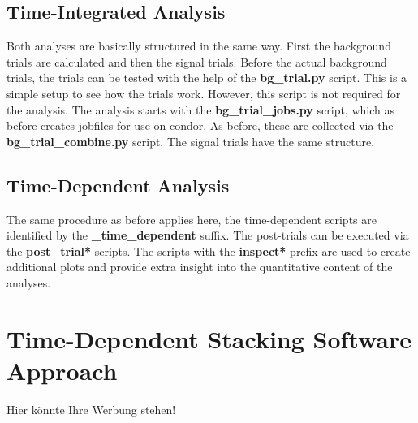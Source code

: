\subsection{Time-Integrated Analysis}

Both analyses are basically structured in the same way.
First the background trials are calculated and then the signal trials.
Before the actual background trials, the trials can be tested with the help of the \textbf{bg\_trial.py} script.
This is a simple setup to see how the trials work.
However, this script is not required for the analysis.
The analysis starts with the \textbf{bg\_trial\_jobs.py} script, which as before creates jobfiles for use on condor.
As before, these are collected via the \textbf{bg\_trial\_combine.py} script.
The signal trials have the same structure.

\subsection{Time-Dependent Analysis}

The same procedure as before applies here, the time-dependent scripts are identified by the \textbf{\_time\_dependent} suffix.
The post-trials can be executed via the \textbf{post\_trial*} scripts.
The scripts with the \textbf{inspect*} prefix are used to create additional plots and provide extra insight into the quantitative content of the analyses.

\section{Time-Dependent Stacking Software Approach}

Hier könnte Ihre Werbung stehen!
